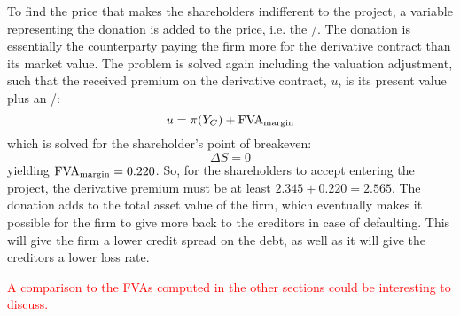 \documentclass[../main.tex]{subfiles}
\begin{document}
        To find the price that makes the shareholders indifferent to the project,
        a variable representing the donation is added to the price, i.e. the \MVA/.
        The donation is essentially the counterparty paying the firm more for the derivative contract than its market value.
        The problem is solved again including the valuation adjustment,
        such that the received premium on the derivative contract, $u$, is its present value plus an \MVA/:
        \begin{equation}
            u = \pi(Y_C) + \MVA/
        \end{equation}
        which is solved for the shareholder's point of breakeven:
        \begin{equation}
            \Delta S = 0
        \end{equation}
        yielding $\MVA/ = 0.220$. So, for the shareholders to accept entering the project, the derivative premium must be at least $2.345 + 0.220 = 2.565$.
        The donation adds to the total asset value of the firm,
        which eventually makes it possible for the firm to give more back to the creditors in case of defaulting.
        This will give the firm a lower credit spread on the debt, as well as it will give the creditors a lower loss rate.

        \textcolor{red}{A comparison to the FVAs computed in the other sections could be interesting to discuss.}
        
\end{document}
